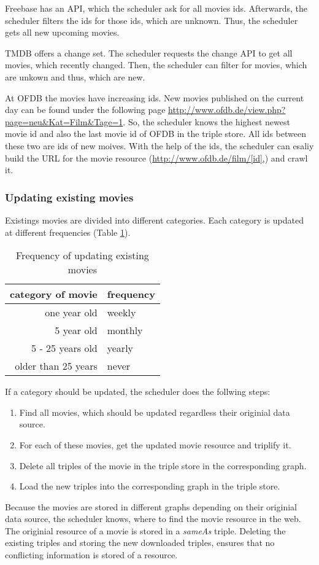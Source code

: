 Freebase has an API, which the scheduler ask for all movies ids.
Afterwards, the scheduler filters the ids for those ids, which are unknown.
Thus, the scheduler gets all new upcoming movies.

TMDB offers a change set.
The scheduler requests the change API to get all movies, which recently changed.
Then, the scheduler can filter for movies, which are unkown and thus, which are new.

At OFDB the movies have increasing ids.
New movies published on the current day can be found under the following page \url{http://www.ofdb.de/view.php?page=neu&Kat=Film&Tage=1}.
So, the scheduler knows the highest newest movie id and also the last movie id of OFDB in the triple store.
All ids between these two are ids of new moives.
With the help of the ids, the scheduler can esaliy build the URL for the movie resource (\url{http://www.ofdb.de/film/[id],}) and crawl it.

\subsubsection{Updating existing movies}
Existings movies are divided into different categories.
Each category is updated at different frequencies (Table \ref{tab_updating_existing}).
\begin{table}[ht]
	\caption{Frequency of updating existing movies}
	\begin{center}
	\begin{tabular}{rl}
		\textbf{category of movie} & \textbf{frequency} \\ \hline
		one year old & weekly \\
		5 year old & monthly \\
		5 - 25 years old & yearly \\
		older than 25 years & never \\
	\end{tabular}
	\end{center}
	\label{tab_updating_existing}
\end{table}
If a category should be updated, the scheduler does the follwing steps:
\begin{enumerate}
	\item Find all movies, which should be updated regardless their originial data source.
	\item For each of these movies, get the updated movie resource and triplify it.
	\item Delete all triples of the movie in the triple store in the corresponding graph.
	\item Load the new triples into the corresponding graph in the triple store.
\end{enumerate}
Because the movies are stored in different graphs depending on their originial data source, the scheduler knows, where to find the movie resource in the web.
The originial resource of a movie is stored in a \emph{sameAs} triple.
Deleting the existing triples and storing the new downloaded triples, ensures that no conflicting information is stored of a resource.